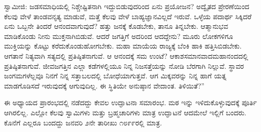  ಸ್ವಾಮೀಜಿ: ಜಡಸಮಾಧಿಯಲ್ಲಿ ನಿಶ್ಚೇಷ್ಟಿತನಾಗಿ ಇದ್ದುಬಿಡುವುದರಿಂದ ಏನು ಪ್ರಯೋಜನ? ಅದ್ವೈತದ ಪ್ರೇರಣೆಯಿಂದ ಕೆಲವು ವೇಳೆ ತಾಂಡವನೃತ್ಯ ಮಾಡುವೆ, ಮತ್ತೆ ಕೆಲವು ವೇಳೆ ಬಾಹ್ಯಜ್ಞಾನವಿಲ್ಲದೆ ಇರುವೆ. ಒಳ್ಳೆಯ ಪದಾರ್ಥ ಸಿಕ್ಕಿದರೆ ಏನು ಒಬ್ಬನೇ ತಿಂದರೆ ಆನಂದವಾಗುವುದೆ? ಹತ್ತು ಜನಕ್ಕೆ ಕೊಡಬೇಕು, ತಾನೂ ತಿನ್ನಬೇಕು. ಆತ್ಮಾನುಭವ ಮಾಡಿಕೊಂಡು ನೀನು ಮುಕ್ತನಾಗಿಬಿಡುವೆ. ಆದರೆ ಜಗತ್ತಿಗೆ ಅದರಿಂದ ಆದದ್ದೇನು? ಮೂರು ಲೋಕಗಳಿಗೂ ಮುಕ್ತಿಯನ್ನು ಕೊಟ್ಟು ಕರೆದುಕೊಂಡುಹೋಗಬೇಕು. ಮಹಾ ಮಾಯೆಯ ರಾಜ್ಯಕ್ಕೆ ಬೆಂಕಿ ಹಾಕಿ ಹತ್ತಿಸಿಬಿಡಬೇಕು. ಆಗತಾನೆ ನಿತ್ಯವಾಗಿ ಸತ್ಯದಲ್ಲಿ ಪ್ರತಿಷ್ಠಿತನಾಗುವೆ. ಆ ಆನಂದಕ್ಕೆ ಸಮ ಉಂಟೆ? ಆಕಾಶಸಮಾನವಾದ\break ಮಹಾನಂದದಲ್ಲಿ ಪ್ರತಿಷ್ಠಿತನಾಗುವೆ. ಜೀವಜಗತ್ತಿನ ಎಲ್ಲಾ ಕಡೆಗಳಲ್ಲಿಯೂ ನಿನ್ನ ನಿಜಸತ್ತೆಯನ್ನು ನೋಡಿ ಬೆರಗಾಗಿ ನಿಲ್ಲುವೆ. ಸ್ಥಾವರ ಜಂಗಮಗಳೆಲ್ಲವೂ ನಿನಗೆ ನಿನ್ನ ಸತ್ತಾಬಲದಲ್ಲಿ ಬೋಧೆಯಾಗುತ್ತವೆ. ಆಗ ಮಿಕ್ಕವರನ್ನು ನಿನ್ನ ಹಾಗೆ ಯತ್ನ ಮಾಡಗೊಡಿಸದೆ ಇರುವುದಕ್ಕೆ ಆಗುವುದಿಲ್ಲ. ಈ ಸ್ಥಿತಿಯೇ ಅನುಷ್ಠಾನ ವೇದಾಂತ. ತಿಳಿಯಿತೆ?” 

 ಈ ಅಧ್ಯಾಯದ ಪ್ರಾರಂಭದಲ್ಲಿ ನಡೆದದ್ದು ಕೇವಲ ಉದ್ಘಾಟನಾ ಸಮಾರಂಭ. ಮಠ ಇನ್ನು ಇಳಿದುಕೊಳ್ಳುವುದಕ್ಕೆ ಪೂರ್ತಿ ಆಗಿರಲಿಲ್ಲ. ಎಲ್ಲೋ ಕೆಲವು ಸ್ವಾಮಿಗಳು ಮತ್ತು ಬ್ರಹ್ಮಚಾರಿಗಳು ಮಾತ್ರ ಉದ್ಘಾಟನೆ ಆದಮೇಲೆ ಇಲ್ಲಿಗೆ ಬಂದರು. ಕೊನೆಗೆ ಎಲ್ಲರೂ ಬಂದದ್ದು ಜನವರಿ ೨ನೇ ತಾರೀಖು ೧೮೯೯ರಲ್ಲಿ ಮಾತ್ರ. 

